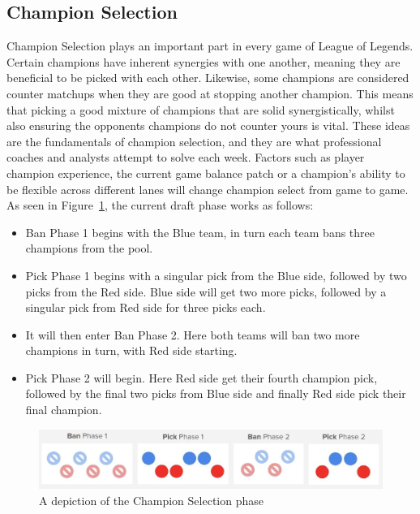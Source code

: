 \subsection{Champion Selection}\label{subsec:champ-select}

Champion Selection plays an important part in every game of League of Legends.
Certain champions have inherent synergies with one another, meaning they are beneficial to be picked with each other.
Likewise, some champions are considered counter matchups when they are good at stopping another champion.
This means that picking a good mixture of \glspl{champion} that are solid synergistically, whilst also ensuring the opponents \glspl{champion} do not counter yours is vital.
These ideas are the fundamentals of champion selection, and they are what professional coaches and analysts attempt to solve each week.
Factors such as player champion experience, the current game balance \gls{patch} or a champion's ability to be flexible across different lanes will change champion select from game to game. \\

As seen in Figure~\ref{fig:draft}, the current draft phase works as follows:
\begin{itemize}
    \item Ban Phase 1 begins with the Blue team, in turn each team bans three champions from the pool.
    \item Pick Phase 1 begins with a singular pick from the Blue side, followed by two picks from the Red side.
     Blue side will get two more picks, followed by a singular pick from Red side for three picks each.
    \item It will then enter Ban Phase 2.
    Here both teams will ban two more champions in turn, with Red side starting.
    \item Pick Phase 2 will begin.
    Here Red side get their fourth champion pick, followed by the final two picks from Blue side and finally Red side pick their final champion.
\end{itemize}

\begin{figure}[h!]
    \centering
    \includegraphics[width=1\textwidth]{figures/DraftPhase}
    \caption{A depiction of the Champion Selection phase}
    \label{fig:draft}
\end{figure}

